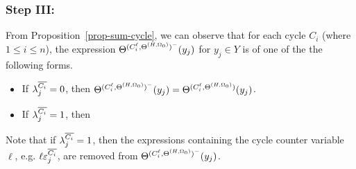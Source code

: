 \subsubsection{Step III:} 

From Proposition~\ref{prop-sum-cycle},  we can observe that for each cycle $C_i$ (where $1 \le i \le n$),  the expression $\Theta^{(C^\ell_i, \Theta^{(H,\Omega_0)})^-}(y_j)$ for $y_j \in Y$ is of one of the the following forms.
\begin{itemize}
\item If $\lambda^{\overline{C_i}}_{j}=0$, then $\Theta^{(C^\ell_i, \Theta^{(H,\Omega_0)})^{-}}(y_j) = \Theta^{(C^\ell_i, \Theta^{(H,\Omega_0)})}(y_j)$.

\item If $\lambda^{\overline{C_i}}_{j}=1$, then
\medskip\\
\end{itemize}
Note that if $\lambda^{\overline{C_i}}_{j}=1$, then the expressions containing the cycle counter variable $\ell$, e.g. $\ell \varepsilon^{\overline{C_i}}_j$, are removed from $\Theta^{(C^\ell_i, \Theta^{(H,\Omega_0)})^-}(y_j)$.

